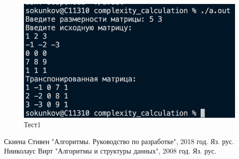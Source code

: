 \documentclass[spec, och, labwork]{shiza}
\begin{document}
    \begin{figure}[H]
        \centering      %
        \includegraphics[width=1.\textwidth]{3}
        \caption{Тест1}
        \label{fig:image1}
    \end{figure}
    
    \newpage
    
    \begin{thebibliography}{3}
        Скиена Стивен "Алгоритмы. Руководство по разработке", 2018 год. Яз. рус.
        Нииколаус Вирт "Алгоритмы и структуры данных", 2008 год. Яз. рус.
    \end{thebibliography}
\end{document}
